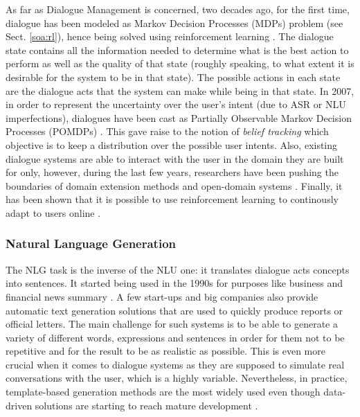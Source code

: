                         As far as Dialogue Management is concerned, two decades ago, for the first time, dialogue has been modeled as Markov Decision Processes (MDPs) problem (see Sect. \ref{soa:rl}), hence being solved using reinforcement learning \cite{Levin1997a}. The dialogue state contains all the information needed to determine what is the best action to perform as well as the quality of that state (roughly speaking, to what extent it is desirable for the system to be in that state). The possible actions in each state are the dialogue acts that the system can make while being in that state. In 2007, in order to represent the uncertainty over the user's intent (due to ASR or NLU imperfections), dialogues have been cast as Partially Observable Markov Decision Processes (POMDPs) \cite{Williams2007}. This gave raise to the notion of \textit{belief tracking} which objective is to keep a distribution over the possible user intents. Also, existing dialogue systems are able to interact with the user in the domain they are built for only, however, during the last few years, researchers have been pushing the boundaries of domain  extension methods \cite{Gasic2013} and open-domain systems \cite{Pakucs2003,Galibert2005,EkeinhorKomi2014,Wang2014}. Finally, it has been shown that it is possible to use reinforcement learning to continously adapt to users online \cite{Ferreira2015c,Chandramohan2012a,Chandramohan2012b}.
                        
                        \subsubsection{Natural Language Generation}
                        
                        The NLG task is the inverse of the NLU one: it translates dialogue acts concepts into sentences. It started being used in the 1990s for purposes like business and financial news summary \cite{Anand1992}. A few start-ups and big companies also provide automatic text generation solutions that are used to quickly produce reports or official letters. The main challenge for such systems is to be able to generate a variety of different words, expressions and sentences in order for them not to be repetitive and for the result to be as realistic as possible. This is even more crucial when it comes to dialogue systems as they are supposed to simulate real conversations with the user, which is a highly variable. Nevertheless, in practice, template-based generation methods are the most widely used even though data-driven solutions are starting to reach mature development \cite{Mairesse2010,Mitchell2014,Manishina2016}.
                        
